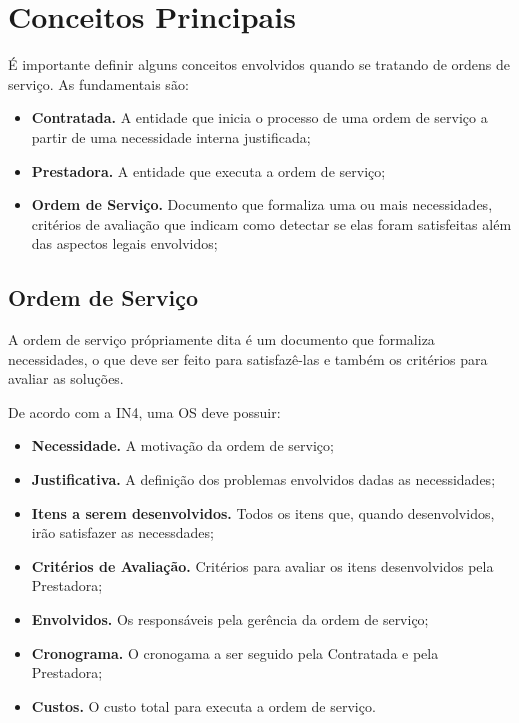 \section{Conceitos Principais}

É importante definir alguns conceitos envolvidos quando se tratando de ordens
de serviço. As fundamentais são:

\begin{itemize}
  \item \textbf{Contratada.} A entidade que inicia o processo de uma ordem de
  serviço a partir de uma necessidade interna justificada;
  \item \textbf{Prestadora.} A entidade que executa a ordem de serviço;
  \item \textbf{Ordem de Serviço.} Documento que formaliza uma ou mais
  necessidades, critérios de avaliação que indicam como detectar se elas foram
  satisfeitas além das aspectos legais envolvidos;
\end{itemize}

\subsection{Ordem de Serviço}

A ordem de serviço própriamente dita é um documento que formaliza necessidades,
o que deve ser feito para satisfazê-las e também os critérios para avaliar as
soluções.

De acordo com a IN4, uma OS deve possuir:

\begin{itemize}
  \item \textbf{Necessidade.} A motivação da ordem de serviço;
  \item \textbf{Justificativa.} A definição dos problemas envolvidos dadas as
  necessidades;
  \item \textbf{Itens a serem desenvolvidos.} Todos os itens que, quando
  desenvolvidos, irão satisfazer as necessdades;
  \item \textbf{Critérios de Avaliação.} Critérios para avaliar os itens
  desenvolvidos pela Prestadora;
  \item \textbf{Envolvidos.} Os responsáveis pela gerência da ordem de serviço;
  \item \textbf{Cronograma.} O cronogama a ser seguido pela Contratada e pela
  Prestadora;
  \item \textbf{Custos.} O custo total para executa a ordem de serviço.
\end{itemize}
